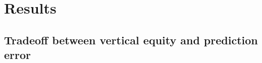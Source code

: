 \documentclass[11pt]{article}
\theoremstyle{plain}
\theoremstyle{definition}
\newcommand{\1}{\mathbf{1}}
\begin{document}

\newpage


\section{Results}

\subsection{Tradeoff between vertical equity and prediction error}
\end{document}
